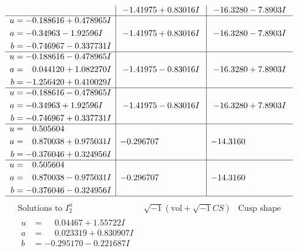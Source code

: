 \documentclass[1p]{elsarticle_modified}
\theoremstyle{definition}
\newcommand{\I}{\sqrt{-1}}
\begin{document}
$$\begin{array}{c|c|c}
 & -1.41975 + 0.83016 I & -16.3280 - 7.8903 I \\ \hline\begin{aligned}
u &= -0.188616 + 0.478965 I \\
a &= -0.34963 - 1.92596 I \\
b &= -0.746967 - 0.337731 I\end{aligned}
 & -1.41975 + 0.83016 I & -16.3280 - 7.8903 I \\ \hline\begin{aligned}
u &= -0.188616 - 0.478965 I \\
a &= \phantom{-}0.044120 + 1.082270 I \\
b &= -1.256420 + 0.410029 I\end{aligned}
 & -1.41975 - 0.83016 I & -16.3280 + 7.8903 I \\ \hline\begin{aligned}
u &= -0.188616 - 0.478965 I \\
a &= -0.34963 + 1.92596 I \\
b &= -0.746967 + 0.337731 I\end{aligned}
 & -1.41975 - 0.83016 I & -16.3280 + 7.8903 I \\ \hline\begin{aligned}
u &= \phantom{-}0.505604\phantom{ +0.000000I} \\
a &= \phantom{-}0.870038 + 0.975031 I \\
b &= -0.376046 + 0.324956 I\end{aligned}
 & -0.296707\phantom{ +0.000000I} & -14.3160\phantom{ +0.000000I} \\ \hline\begin{aligned}
u &= \phantom{-}0.505604\phantom{ +0.000000I} \\
a &= \phantom{-}0.870038 - 0.975031 I \\
b &= -0.376046 - 0.324956 I\end{aligned}
 & -0.296707\phantom{ +0.000000I} & -14.3160\phantom{ +0.000000I}\\
 \hline 
 \end{array}$$\newpage$$\begin{array}{c|c|c}  
\text{Solutions to }I^u_{2}& \I (\text{vol} + \sqrt{-1}CS) & \text{Cusp shape}\\
 \hline 
\begin{aligned}
u &= \phantom{-}0.04467 + 1.55722 I \\
a &= \phantom{-}0.023319 + 0.830907 I \\
b &= -0.295170 - 0.221687 I\end{aligned}

\end{array}$$
\end{document}
